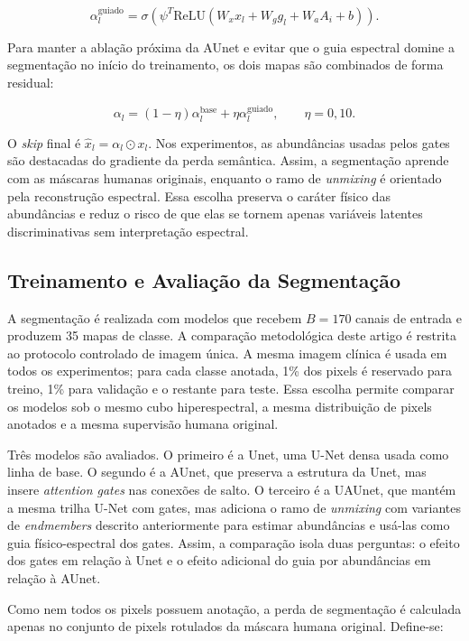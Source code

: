 \documentclass[conference]{IEEEtran}
\begin{document}
\[
\alpha_l^{\mathrm{guiado}} =
\sigma\left(
\psi^{T}
\mathrm{ReLU}(W_xx_l+W_gg_l+W_aA_i+b)
\right).
\]

Para manter a ablação próxima da AUnet e evitar que o guia espectral
domine a segmentação no início do treinamento, os dois mapas são combinados de
forma residual:

\[
\alpha_l =
(1-\eta)\alpha_l^{\mathrm{base}} +
\eta\alpha_l^{\mathrm{guiado}},
\qquad \eta=0{,}10.
\]

O \textit{skip} final é $\hat{x}_l=\alpha_l\odot x_l$. Nos experimentos, as
abundâncias usadas pelos gates são destacadas do gradiente da perda semântica.
Assim, a segmentação aprende com as máscaras humanas originais, enquanto o ramo
de \textit{unmixing} é orientado pela reconstrução espectral. Essa escolha
preserva o caráter físico das abundâncias e reduz o risco de que elas se tornem
apenas variáveis latentes discriminativas sem interpretação espectral.

\subsection{Treinamento e Avaliação da Segmentação}

A segmentação é realizada com modelos que recebem $B=170$ canais de entrada e
produzem 35 mapas de classe. A comparação metodológica deste artigo é restrita
ao protocolo controlado de imagem única. A mesma imagem clínica é usada em
todos os experimentos; para cada classe
anotada, 1\% dos pixels é reservado para treino, 1\% para validação e o restante
para teste. Essa escolha permite comparar os modelos sob o mesmo cubo
hiperespectral, a mesma distribuição de pixels anotados e a mesma supervisão
humana original.

Três modelos são avaliados. O primeiro é a Unet, uma U-Net densa usada
como linha de base. O segundo é a AUnet, que preserva a estrutura da
Unet, mas insere \textit{attention gates} nas conexões de salto. O terceiro
é a UAUnet, que mantém a mesma trilha U-Net com gates, mas adiciona o ramo de
\textit{unmixing} com variantes de \textit{endmembers} descrito anteriormente
para estimar abundâncias e usá-las como guia físico-espectral dos gates. Assim,
a comparação isola duas perguntas: o efeito dos gates em relação à Unet e o
efeito adicional do guia por abundâncias em relação à AUnet.

Como nem todos os pixels possuem anotação, a perda de segmentação é calculada
apenas no conjunto de pixels rotulados da máscara humana original. Define-se:
\end{document}
